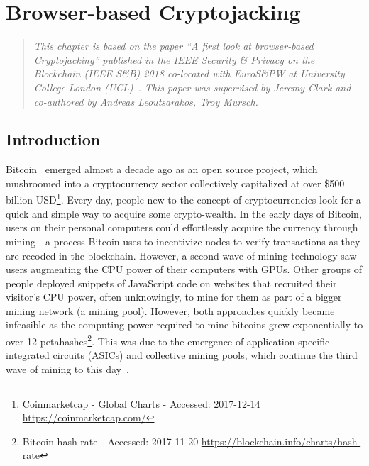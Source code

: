 

\chapter{Browser-based Cryptojacking}

\begin{quote}
	\textit{This chapter is based on the paper ``A first look at browser-based Cryptojacking'' published in the IEEE Security \& Privacy on the Blockchain (IEEE S\&B) 2018 co-located with EuroS\&PW at University College London (UCL)~\cite{eskandari2018first}. This paper was supervised by Jeremy Clark and co-authored by Andreas Leoutsarakos, Troy Mursch.}
\end{quote}

\section{Introduction}

Bitcoin~\cite{nakamoto2008bitcoin} emerged almost a decade ago as an open source project, which mushroomed into a cryptocurrency sector collectively capitalized at over \$500 billion USD\footnote{Coinmarketcap - Global Charts - Accessed: 2017-12-14 \url{https://coinmarketcap.com/}}. Every day, people new to the concept of cryptocurrencies look for a quick and simple way to acquire some crypto-wealth. In the early days of Bitcoin, users on their personal computers could effortlessly acquire the currency through mining---a process Bitcoin uses to incentivize nodes to verify transactions as they are recoded in the blockchain. However, a second wave of mining technology saw users augmenting the CPU power of their computers with GPUs. Other groups of people deployed snippets of JavaScript code on websites that recruited their visitor's CPU power, often unknowingly, to mine for them as part of a bigger mining network (\ie a mining pool). However, both approaches quickly became infeasible as the computing power required to mine bitcoins grew exponentially to over 12 petahashes\footnote{Bitcoin hash rate - Accessed: 2017-11-20 \url{https://blockchain.info/charts/hash-rate}}. This was due to the emergence of application-specific integrated circuits (ASICs) and collective mining pools, which continue the third wave of mining to this day~\cite{narayanan2016}. 

